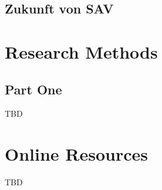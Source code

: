 \documentclass[sigplan,screen]{acmart}
\begin{document}
\subsection{Zukunft von SAV}



\appendix

\section{Research Methods}

\subsection{Part One}

TBD


\section{Online Resources}

TBD
\end{document}
